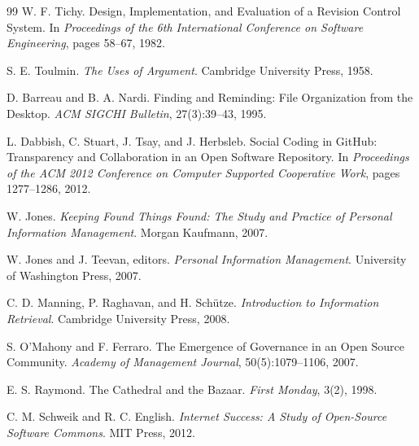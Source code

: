 \documentclass[11pt,twoside,openright]{book}
\theoremstyle{plain}
\theoremstyle{definition}
\theoremstyle{remark}
\begin{document}
\begin{thebibliography}{99}
 W. F. Tichy. Design, Implementation, and Evaluation of a Revision Control System. In \emph{Proceedings of the 6th International Conference on Software Engineering}, pages 58--67, 1982.

 S. E. Toulmin. \emph{The Uses of Argument}. Cambridge University Press, 1958.

 D. Barreau and B. A. Nardi. Finding and Reminding: File Organization from the Desktop. \emph{ACM SIGCHI Bulletin}, 27(3):39--43, 1995.

 L. Dabbish, C. Stuart, J. Tsay, and J. Herbsleb. Social Coding in GitHub: Transparency and Collaboration in an Open Software Repository. In \emph{Proceedings of the ACM 2012 Conference on Computer Supported Cooperative Work}, pages 1277--1286, 2012.

 W. Jones. \emph{Keeping Found Things Found: The Study and Practice of Personal Information Management}. Morgan Kaufmann, 2007.

 W. Jones and J. Teevan, editors. \emph{Personal Information Management}. University of Washington Press, 2007.

 C. D. Manning, P. Raghavan, and H. Sch\"utze. \emph{Introduction to Information Retrieval}. Cambridge University Press, 2008.

 S. O'Mahony and F. Ferraro. The Emergence of Governance in an Open Source Community. \emph{Academy of Management Journal}, 50(5):1079--1106, 2007.

 E. S. Raymond. The Cathedral and the Bazaar. \emph{First Monday}, 3(2), 1998.

 C. M. Schweik and R. C. English. \emph{Internet Success: A Study of Open-Source Software Commons}. MIT Press, 2012.

\end{thebibliography}
\end{document}
